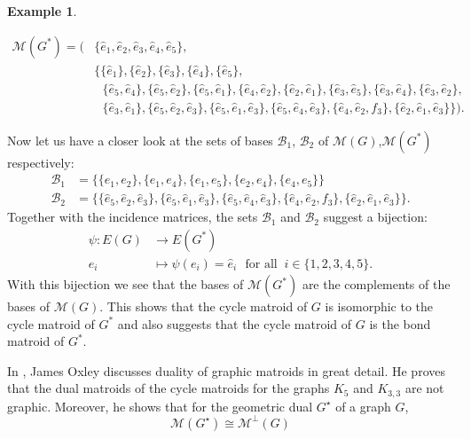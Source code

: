 \documentclass[12pt,a4paper, twoside, autooneside=false]{scrartcl}
\theoremstyle{definition}
\newtheorem{beispiel}[theorem]{Example}
\theoremstyle{remark}
\numberwithin{equation}{section}
\newcommand{\M}{\mathcal{M}} %
\begin{document}
\begin{beispiel}
\begin{center}
\begin{align*}
\M(G^*) = \bigg(&\bigg\{\hat{e}_1,\hat{e}_2,\hat{e}_3,\hat{e}_4,\hat{e}_5\bigg\}, \\  \ \ \ 
&\bigg\{\{\hat{e}_1\}, \{\hat{e}_2\}, \{\hat{e}_3\}, \{\hat{e}_4\}, \{\hat{e}_5\}, \\ & \ \ \ \{\hat{e}_5, \hat{e}_4\}, \{\hat{e}_5, \hat{e}_2\}, \{\hat{e}_5, \hat{e}_1\}, \{\hat{e}_4, \hat{e}_2\}, \{\hat{e}_2, \hat{e}_1\}, \{\hat{e}_3, \hat{e}_5\}, \{\hat{e}_3, \hat{e}_4\}, \{\hat{e}_3, \hat{e}_2\}, \\ & \ \ \
 \{\hat{e}_3, \hat{e}_1\}, \{\hat{e}_5, \hat{e}_2, \hat{e}_3\}, \{\hat{e}_5, \hat{e}_1, \hat{e}_3\}, \{\hat{e}_5, \hat{e}_4, \hat{e}_3\}, \{\hat{e}_4, \hat{e}_2, f_3\}, \{\hat{e}_2, \hat{e}_1, \hat{e}_3\}\bigg\}\bigg).
\end{align*}
\end{center}
Now let us have a closer look at the sets of bases $\mathcal{B}_1$, $\mathcal{B}_2$ of $\M(G)$,$\M(G^*)$ respectively: 
\begin{align*}
\mathcal{B}_1 &= \{ \{e_1, e_2\}, \{e_1, e_4\}, \{e_1, e_5\}, \{e_2, e_4\}, \{e_4, e_5\}\} \\
\mathcal{B}_2 &= \{\{\hat{e}_5, \hat{e}_2, \hat{e}_3\}, \{\hat{e}_5, \hat{e}_1, \hat{e}_3\}, \{\hat{e}_5, \hat{e}_4, \hat{e}_3\}, \{\hat{e}_4, \hat{e}_2, f_3\}, \{\hat{e}_2, \hat{e}_1, \hat{e}_3\}\}.
\end{align*}
Together with the incidence matrices, the sets $\mathcal{B}_1$ and $\mathcal{B}_2$ suggest a bijection:
\begin{align*}
\psi: E(G) &\to E(G^*) \\ 
e_i &\mapsto \psi(e_i) = \hat{e}_i \ \ \ \text{for all } \ i \in \{1,2,3,4,5\}.
\end{align*}
With this bijection we see that the bases of $\M(G^*)$ are the complements of the bases of $\M(G)$. This shows that the cycle matroid of $G$ is isomorphic to the cycle matroid of $G^*$ and also suggests that the cycle matroid of $G$ is the bond matroid of $G^*$.
\end{beispiel}
In \cite{Oxl2011}, James Oxley discusses duality of graphic matroids in great detail. He proves that the dual matroids of the cycle matroids for the graphs $K_5$ and $K_{3,3}$ are not graphic. Moreover, he shows that for the geometric dual $G^\star$ of a graph $G$, 
\begin{equation} \label{test23}
\M(G^\star) \cong \M^\perp(G)
\end{equation}
\end{document}
